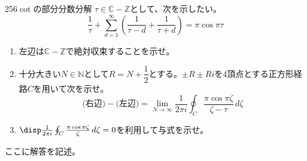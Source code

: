 \begin{thm}{256}{}{$\cot$の部分分数分解}
 $\tau\in\mathbb{C}-\mathbb{Z}$として、次を示したい。
 \[ \frac{1}{\tau}+\sum_{d=1}^\infty\left(\frac{1}{\tau-d}+\frac{1}{\tau+d}\right)=\pi\cos\pi\tau \]
 \begin{enumerate}
  \item 左辺は$\mathbb{C}-\mathbb{Z}$で絶対収束することを示せ。
  \item 十分大きい$N\in\mathbb{N}$として$R=N+\dfrac{1}{2}$とする。$\pm R\pm Ri$を4頂点とする正方形経路$C$を用いて次を示せ。
	\[ \text{(右辺)}-\text{(左辺)}=\lim_{N\to\infty}\frac{1}{2\pi i}\oint_C\!\frac{\pi\cos\pi\zeta}{\zeta-\tau} \,d\zeta \]
  \item $\disp \frac{1}{2\pi i}\oint_C \frac{\pi\cos\pi\zeta}{\zeta} \,d\zeta=0$を利用して与式を示せ。
 \end{enumerate}
\end{thm}
ここに解答を記述。